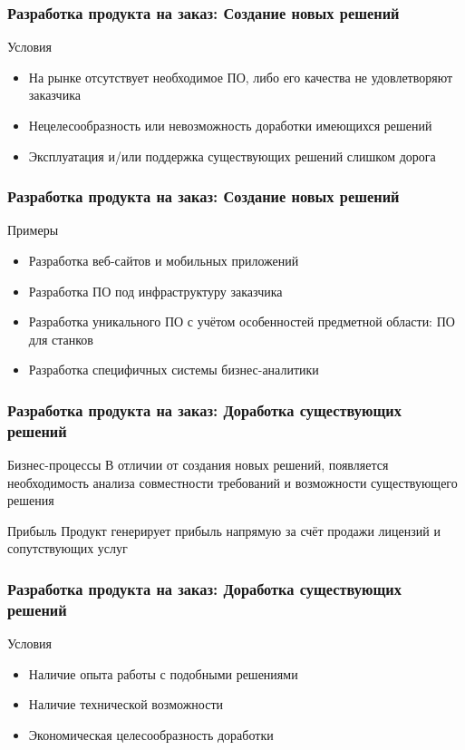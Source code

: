 \documentclass{../industrial-development}
\begin{document}
\begin{frame} \frametitle{Разработка продукта на заказ: Создание новых решений}
	\begin{block}{Условия}
		\begin{itemize}
			\item На рынке отсутствует необходимое ПО, либо его качества не удовлетворяют заказчика
			\item Нецелесообразность или невозможность доработки имеющихся решений
			\item Эксплуатация и/или поддержка существующих решений слишком дорога
		\end{itemize}
	\end{block}
\end{frame}
\lecturenotes


\begin{frame} \frametitle{Разработка продукта на заказ: Создание новых решений}
	\begin{block}{Примеры}
		\begin{itemize}
			\item Разработка веб-сайтов и мобильных приложений
			\item Разработка ПО под инфраструктуру заказчика
			\item Разработка уникального ПО с учётом особенностей предметной области: ПО для станков
			\item Разработка специфичных системы бизнес-аналитики
		\end{itemize}
	\end{block}
\end{frame}
\lecturenotes


\begin{frame} \frametitle{Разработка продукта на заказ: Доработка существующих решений}
	\begin{block}{Бизнес-процессы}
		В отличии от создания новых решений, появляется необходимость анализа совместности требований и возможности существующего решения
	\end{block}
	\begin{block}{Прибыль}
		Продукт генерирует прибыль напрямую за счёт продажи лицензий и сопутствующих услуг
	\end{block}
\end{frame}
\lecturenotes


\begin{frame} \frametitle{Разработка продукта на заказ: Доработка существующих решений}
	\begin{block}{Условия}
		\begin{itemize}
			\item Наличие опыта работы с подобными решениями
			\item Наличие технической возможности
			\item Экономическая целесообразность доработки
		\end{itemize}
	\end{block}
\end{frame}
\lecturenotes
\end{document}
